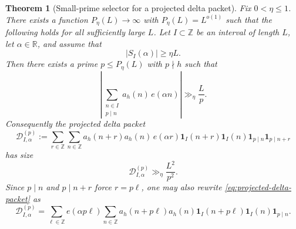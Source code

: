 \documentclass[11pt]{scrartcl}
\numberwithin{equation}{section}
\newtheorem{theorem}{Theorem}[section]
\theoremstyle{definition}
\newcommand{\Z}{\mathbb Z}
\newcommand{\R}{\mathbb R}
\newcommand{\1}{\mathbf 1}
\newcommand{\ee}[1]{e\!\left(#1\right)}
\begin{document}
\begin{theorem}[Small-prime selector for a projected delta packet]
\label{thm:small-prime-projected-delta}
Fix $0<\eta\le 1$. There exists a function $P_\eta(L)\to\infty$ with $P_\eta(L)=L^{o(1)}$ such that the following holds for all sufficiently large $L$. Let $I\subset\Z$ be an interval of length $L$, let $\alpha\in\R$, and assume that
\[
|S_I(\alpha)|\ge \eta L.
\]
Then there exists a prime $p\le P_\eta(L)$ with $p\nmid h$ such that
\begin{equation}
\label{eq:small-prime-slice-bias}
\left|\sum_{\substack{n\in I\\ p\mid n}} a_h(n)\,\ee{\alpha n}\right|
\gg_\eta \frac{L}{p}.
\end{equation}
Consequently the projected delta packet
\begin{equation}
\label{eq:projected-delta-packet}
\mathcal D^{(p)}_{I,\alpha}
:=
\sum_{r\in\Z}\sum_{n\in\Z}
 a_h(n+r)a_h(n)\,\ee{\alpha r}
\mathbf 1_I(n+r)\mathbf 1_I(n)
\mathbf 1_{p\mid n}\mathbf 1_{p\mid n+r}
\end{equation}
has size
\begin{equation}
\label{eq:projected-delta-packet-lb}
\mathcal D^{(p)}_{I,\alpha}
\gg_\eta
\frac{L^2}{p^2}.
\end{equation}
Since $p\mid n$ and $p\mid n+r$ force $r=p\ell$, one may also rewrite \eqref{eq:projected-delta-packet} as
\begin{equation}
\label{eq:projected-delta-packet-step-p}
\mathcal D^{(p)}_{I,\alpha}
=
\sum_{\ell\in\Z}\ee{\alpha p\ell}
\sum_{n\in\Z} a_h(n+p\ell)a_h(n)
\mathbf 1_I(n+p\ell)\mathbf 1_I(n)\mathbf 1_{p\mid n}.
\end{equation}
\end{theorem}
\end{document}
